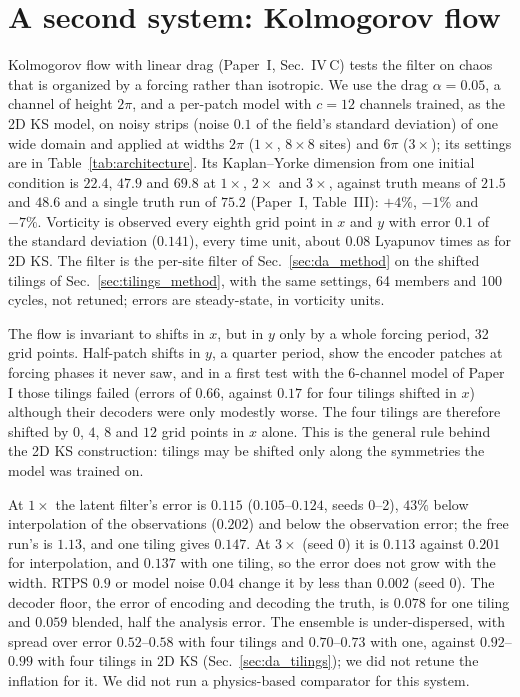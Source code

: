 \section{A second system: Kolmogorov flow}
\label{sec:kolmogorov_da}

Kolmogorov flow with linear drag (Paper~I, Sec.~IV\,C) tests the filter on chaos that is organized by a
forcing rather than isotropic. We use the drag $\alpha=0.05$, a channel of height $2\pi$, and a
per-patch model with $c=12$ channels trained, as the 2D KS model, on noisy strips (noise $0.1$ of the
field's standard deviation) of one wide domain and applied at widths $2\pi$ ($1\times$, $8\times8$ sites)
and $6\pi$ ($3\times$); its settings are in Table~\ref{tab:architecture}. Its Kaplan--Yorke dimension from one initial condition is $22.4$, $47.9$ and
$69.8$ at $1\times$, $2\times$ and $3\times$, against truth means of $21.5$ and $48.6$ and a single truth
run of $75.2$ (Paper~I, Table~III): $+4\%$, $-1\%$ and $-7\%$. Vorticity is observed every eighth grid
point in $x$ and $y$ with error $0.1$ of the standard deviation ($0.141$), every time unit, about $0.08$
Lyapunov times as for 2D KS. The filter is the per-site filter of Sec.~\ref{sec:da_method} on the shifted tilings of
Sec.~\ref{sec:tilings_method}, with the same settings,
64 members and 100 cycles, not retuned; errors are steady-state, in vorticity units.

 The flow is invariant to shifts in $x$, but in $y$ only by a whole forcing
period, 32 grid points. Half-patch shifts in $y$, a quarter period, show the encoder patches at forcing
phases it never saw, and in a first test with the 6-channel model of Paper I those tilings failed
(errors of $0.66$, against $0.17$ for four tilings shifted in $x$) although their decoders were only
modestly worse. The four
tilings are therefore shifted by $0$, $4$, $8$ and $12$ grid points in $x$ alone. This is the general rule
behind the 2D KS construction: tilings may be shifted only along the symmetries the model was trained on.

 At $1\times$ the latent filter's error is $0.115$ ($0.105$--$0.124$, seeds 0--2), $43\%$
below interpolation of the observations ($0.202$) and below the observation error; the free run's is
$1.13$, and one tiling gives $0.147$. At $3\times$ (seed 0) it is $0.113$ against $0.201$ for
interpolation, and $0.137$ with one tiling, so the error does not grow with the width. RTPS $0.9$ or
model noise $0.04$ change it by less than $0.002$ (seed 0). The decoder floor, the error of encoding and
decoding the truth, is $0.078$ for one tiling and $0.059$ blended, half the analysis error. The ensemble
is under-dispersed, with spread over error $0.52$--$0.58$ with four tilings and $0.70$--$0.73$ with one,
against $0.92$--$0.99$ with four tilings in 2D KS (Sec.~\ref{sec:da_tilings}); we did not retune the
inflation for it.
We did not run a physics-based comparator for this system.
